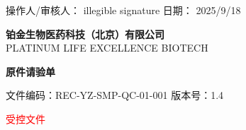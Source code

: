 \documentclass[UTF8,10pt,a4paper,fontset=fandol]{ctexart}
\newcommand{\fieldvalue}[1]{#1}
\newcommand{\handwritten}[1]{#1}
\begin{document}
\vfill

\noindent
操作人/审核人：
\fieldvalue{\handwritten{illegible signature}}
\hfill
日期：
\fieldvalue{\handwritten{2025/9/18}}

\newpage

\begin{center}
\textbf{铂金生物医药科技（北京）有限公司}\\
PLATINUM LIFE EXCELLENCE BIOTECH

\vspace{0.5em}
\textbf{原件请验单}
\end{center}

\noindent 文件编码：REC-YZ-SMP-QC-01-001 \hfill 版本号：1.4

\begin{center}
\textcolor{red}{受控文件}
\end{center}
\end{document}

